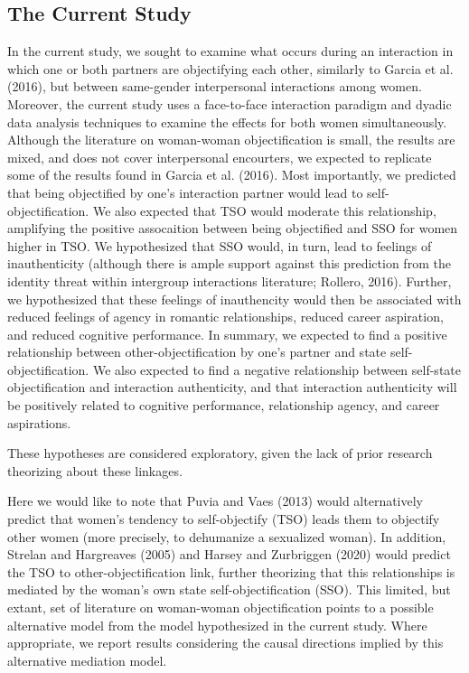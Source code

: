 \documentclass[man]{apa6}
\begin{document}
\subsection{The Current Study}\label{the-current-study}

In the current study, we sought to examine what occurs during an
interaction in which one or both partners are objectifying each other,
similarly to Garcia et al. (2016), but between same-gender interpersonal
interactions among women. Moreover, the current study uses a
face-to-face interaction paradigm and dyadic data analysis techniques to
examine the effects for both women simultaneously. Although the
literature on woman-woman objectification is small, the results are
mixed, and does not cover interpersonal encourters, we expected to
replicate some of the results found in Garcia et al. (2016). Most
importantly, we predicted that being objectified by one's interaction
partner would lead to self-objectification. We also expected that TSO
would moderate this relationship, amplifying the positive assocaition
between being objectified and SSO for women higher in TSO. We
hypothesized that SSO would, in turn, lead to feelings of inauthenticity
(although there is ample support against this prediction from the
identity threat within intergroup interactions literature; Rollero,
2016). Further, we hypothesized that these feelings of inauthencity
would then be associated with reduced feelings of agency in romantic
relationships, reduced career aspiration, and reduced cognitive
performance. In summary, we expected to find a positive relationship
between other-objectification by one's partner and state
self-objectification. We also expected to find a negative relationship
between self-state objectification and interaction authenticity, and
that interaction authenticity will be positively related to cognitive
performance, relationship agency, and career aspirations.

These hypotheses are considered exploratory, given the lack of prior
research theorizing about these linkages.

Here we would like to note that Puvia and Vaes (2013) would
alternatively predict that women's tendency to self-objectify (TSO)
leads them to objectify other women (more precisely, to dehumanize a
sexualized woman). In addition, Strelan and Hargreaves (2005) and Harsey
and Zurbriggen (2020) would predict the TSO to other-objectification
link, further theorizing that this relationships is mediated by the
woman's own state self-objectification (SSO). This limited, but extant,
set of literature on woman-woman objectification points to a possible
alternative model from the model hypothesized in the current study.
Where appropriate, we report results considering the causal directions
implied by this alternative mediation model.
\end{document}
